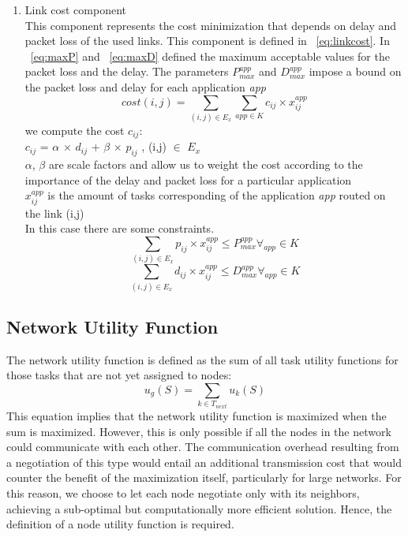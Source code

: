 \documentclass[a4paper]{article}
\begin{document}
\begin{enumerate}
\item Link cost component \\
This component represents the cost minimization that depends on delay and packet loss of the used links. This component is defined in ~\ref{eq:linkcost}. In ~\ref{eq:maxP} and ~\ref{eq:maxD} defined the maximum acceptable values for the packet loss and the delay. The parameters $P^{app}_{max}$ and $D^{app}_{max}$ impose a bound on the packet loss and delay for each application \textit{app} 
\begin{equation} \label{eq:linkcost}
cost(i,j) = \sum_{(i,j) \in E_x} \sum_{app \in K} c_{ij} \times x_{ij}^{app}
\end{equation}
we compute the cost $c_{ij}$: \\
$c_{ij}$ = $\alpha$ $\times$ $d_{ij}$ + $\beta$ $\times$ $p_{ij}$ , (i,j) $\in$ $E_x$\\
$\alpha$, $\beta$ are scale factors and allow us to weight the cost according to the importance of the delay and packet loss for a particular application \\
$x_{ij}^{app}$ is the amount of tasks corresponding of the application \textit{app} routed on the link (i,j)\\

In this case there are some constraints. 
\begin{equation}\label{eq:maxP}
\sum_{(i,j) \in E_x} p_{ij} \times x_{ij}^{app} \le P_{max}^{app} \forall_{app} \in K
\end{equation}
\begin{equation}\label{eq:maxD}
\sum_{(i,j) \in E_x} d_{ij} \times x_{ij}^{app} \le D_{max}^{app} \forall_{app} \in K 
\end{equation}
\end{enumerate}

\subsection{Network Utility Function}
The network utility function is defined as the sum of all task utility functions for those tasks that are not yet assigned to nodes: 
\begin{equation}
u_g(S) = \sum_{k \in T_{next}} u_k(S)
\end{equation}
This equation implies that the network utility function is maximized when the sum is maximized. However, this is only possible if all the nodes in the network could communicate with each other. The communication overhead resulting from a negotiation of this type would entail an additional transmission cost that would counter the  benefit of the maximization itself, particularly for large networks. For this reason, we choose to let each node negotiate only with its neighbors, achieving a sub-optimal but computationally more efficient solution. Hence, the definition of a node utility function is required.\\
\end{document}
